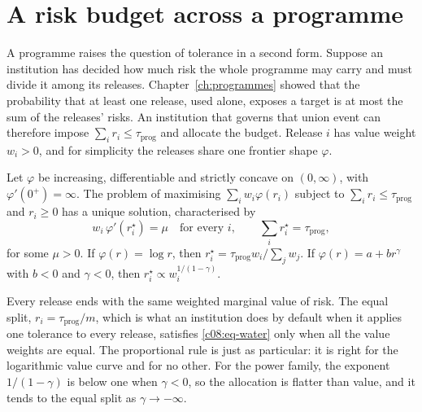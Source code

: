 \section{A risk budget across a programme}\label{c08:sec-budget}

A programme raises the question of tolerance in a second form. Suppose an
institution has decided how much risk the whole programme may carry and must divide
it among its releases. Chapter~\ref{ch:programmes} showed that the probability that
at least one release, used alone, exposes a target is at most the sum of the
releases' risks. An institution that governs that union event can therefore impose
$\sum_i r_i \le \tau_{\mathrm{prog}}$ and allocate the budget. Release $i$ has value
weight $w_i > 0$, and for simplicity the releases share one frontier shape
$\varphi$.

\begin{proposition}\label{c08:prop-budget}
Let $\varphi$ be increasing, differentiable and strictly concave on $(0,\infty)$,
with $\varphi'(0^+) = \infty$. The problem of maximising $\sum_i w_i \varphi(r_i)$
subject to $\sum_i r_i \le \tau_{\mathrm{prog}}$ and $r_i \ge 0$ has a unique
solution, characterised by
\begin{equation}\label{c08:eq-water}
w_i\,\varphi'(r_i^\star) = \mu \quad \text{for every } i, \qquad
\sum_i r_i^\star = \tau_{\mathrm{prog}},
\end{equation}
for some $\mu > 0$. If $\varphi(r) = \log r$, then $r_i^\star = \tau_{\mathrm{prog}}
w_i / \sum_j w_j$. If $\varphi(r) = a + b r^{\gamma}$ with $b < 0$ and $\gamma < 0$,
then $r_i^\star \propto w_i^{1/(1-\gamma)}$.
\end{proposition}

Every release ends with the same weighted marginal value of risk. The equal split,
$r_i = \tau_{\mathrm{prog}}/m$, which is what an institution does by default when it
applies one tolerance to every release, satisfies \eqref{c08:eq-water} only when all
the value weights are equal. The proportional rule is just as particular: it is
right for the logarithmic value curve and for no other. For the power family, the
exponent $1/(1-\gamma)$ is below one when $\gamma < 0$, so the allocation is flatter
than value, and it tends to the equal split as $\gamma \to -\infty$.

